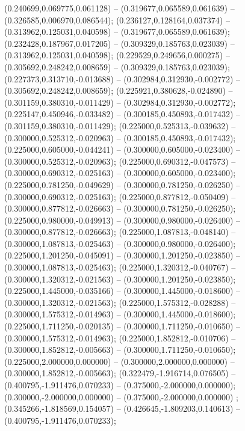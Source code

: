  (0.240699,0.069775,0.061128) -- (0.319677,0.065589,0.061639) -- (0.326585,0.006970,0.086544);
 (0.236127,0.128164,0.037374) -- (0.313962,0.125031,0.040598) -- (0.319677,0.065589,0.061639);
 (0.232428,0.187967,0.017205) -- (0.309329,0.185763,0.023039) -- (0.313962,0.125031,0.040598);
 (0.229529,0.249656,0.000275) -- (0.305692,0.248242,0.008659) -- (0.309329,0.185763,0.023039);
 (0.227373,0.313710,-0.013688) -- (0.302984,0.312930,-0.002772) -- (0.305692,0.248242,0.008659);
 (0.225921,0.380628,-0.024890) -- (0.301159,0.380310,-0.011429) -- (0.302984,0.312930,-0.002772);
 (0.225147,0.450946,-0.033482) -- (0.300185,0.450893,-0.017432) -- (0.301159,0.380310,-0.011429);
 (0.225000,0.525313,-0.039632) -- (0.300000,0.525312,-0.020963) -- (0.300185,0.450893,-0.017432);
 (0.225000,0.605000,-0.044241) -- (0.300000,0.605000,-0.023400) -- (0.300000,0.525312,-0.020963);
 (0.225000,0.690312,-0.047573) -- (0.300000,0.690312,-0.025163) -- (0.300000,0.605000,-0.023400);
 (0.225000,0.781250,-0.049629) -- (0.300000,0.781250,-0.026250) -- (0.300000,0.690312,-0.025163);
 (0.225000,0.877812,-0.050409) -- (0.300000,0.877812,-0.026663) -- (0.300000,0.781250,-0.026250);
 (0.225000,0.980000,-0.049913) -- (0.300000,0.980000,-0.026400) -- (0.300000,0.877812,-0.026663);
 (0.225000,1.087813,-0.048140) -- (0.300000,1.087813,-0.025463) -- (0.300000,0.980000,-0.026400);
 (0.225000,1.201250,-0.045091) -- (0.300000,1.201250,-0.023850) -- (0.300000,1.087813,-0.025463);
 (0.225000,1.320312,-0.040767) -- (0.300000,1.320312,-0.021563) -- (0.300000,1.201250,-0.023850);
 (0.225000,1.445000,-0.035166) -- (0.300000,1.445000,-0.018600) -- (0.300000,1.320312,-0.021563);
 (0.225000,1.575312,-0.028288) -- (0.300000,1.575312,-0.014963) -- (0.300000,1.445000,-0.018600);
 (0.225000,1.711250,-0.020135) -- (0.300000,1.711250,-0.010650) -- (0.300000,1.575312,-0.014963);
 (0.225000,1.852812,-0.010706) -- (0.300000,1.852812,-0.005663) -- (0.300000,1.711250,-0.010650);
 (0.225000,2.000000,0.000000) -- (0.300000,2.000000,0.000000) -- (0.300000,1.852812,-0.005663);
 (0.322479,-1.916714,0.076505) -- (0.400795,-1.911476,0.070233) -- (0.375000,-2.000000,0.000000);
 (0.300000,-2.000000,0.000000) -- (0.375000,-2.000000,0.000000) ;
 (0.345266,-1.818569,0.154057) -- (0.426645,-1.809203,0.140613) -- (0.400795,-1.911476,0.070233);
